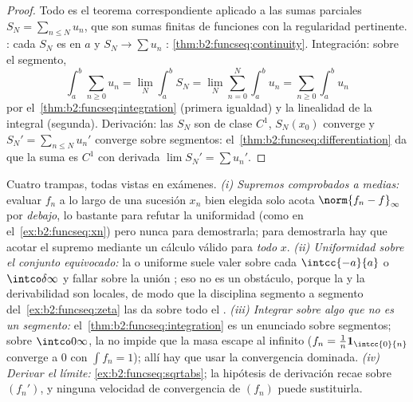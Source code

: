 \begin{proof}
Todo es el teorema correspondiente aplicado a las sumas parciales
$S_N = \sum_{n\leq N}u_n$, que son sumas finitas de funciones con la
regularidad pertinente. : cada $S_N$ es  en $a$ y
$S_N \to \sum u_n$ :
\cref{thm:b2:funcseq:continuity}. Integración: sobre el segmento,
\[
\int_a^b \sum_{n\geq0} u_n
= \lim_N \int_a^b S_N
= \lim_N \sum_{n=0}^{N}\int_a^b u_n
= \sum_{n\geq0}\int_a^b u_n
\]
por el~\cref{thm:b2:funcseq:integration} (primera igualdad) y la
linealidad de la integral (segunda). Derivación: las $S_N$ son de
clase $C^1$, $S_N(x_0)$ converge y $S_N' = \sum_{n\leq N}u_n'$
converge  sobre segmentos: el~\cref{thm:b2:funcseq:differentiation} da que la suma es $C^1$ con
derivada $\lim S_N' = \sum u_n'$.
\end{proof}

\begin{remark}
Cuatro trampas, todas vistas en exámenes. \emph{(i) Supremos
comprobados a medias:} evaluar $f_n$ a lo largo de una sucesión
$x_n$ bien elegida solo acota $\norm{f_n - f}_\infty$ por
\emph{debajo}, lo bastante para refutar la uniformidad (como en el~\cref{ex:b2:funcseq:xn}) pero nunca para demostrarla; para
demostrarla hay que acotar el supremo mediante un cálculo válido
para \emph{todo} $x$. \emph{(ii) Uniformidad sobre el conjunto
equivocado:} la  o uniforme suele valer sobre
cada $\intcc{-a}{a}$ o $\intco\delta\infty$ y fallar sobre la unión
; eso no es un obstáculo, porque la  y la
derivabilidad son locales, de modo que la disciplina segmento a
segmento del~\cref{ex:b2:funcseq:zeta} las da sobre todo el .
\emph{(iii) Integrar sobre algo que no es un segmento:} el~\cref{thm:b2:funcseq:integration} es un enunciado sobre segmentos;
sobre $\intco0\infty$, la  no impide que la masa
escape al infinito ($f_n = \frac1n\mathbf 1_{\intcc{0}{n}}$ converge
 a $0$ con $\int f_n = 1$); allí hay que usar la
convergencia dominada. \emph{(iv) Derivar el límite:}
\cref{ex:b2:funcseq:sqrtabs}; la hipótesis de derivación recae sobre
$(f_n')$, y ninguna velocidad de convergencia de $(f_n)$ puede
sustituirla.
\end{remark}

